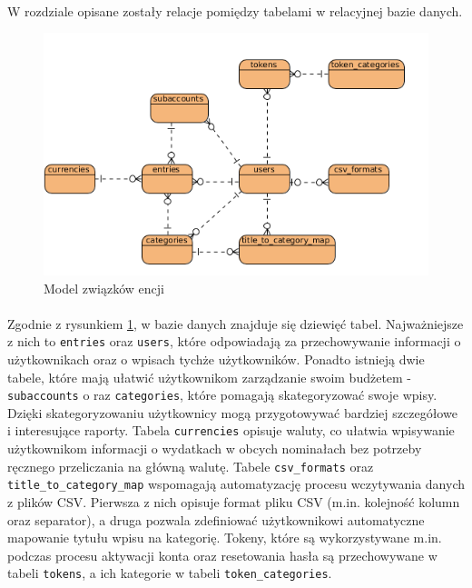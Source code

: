 \documentclass{article}
\begin{document}
	\paragraph{} W rozdziale opisane zostały relacje pomiędzy tabelami w relacyjnej bazie danych.
	\begin{figure}[H]
		\centering
		\includegraphics[width=0.8\linewidth]{assets/erd.png}
		\caption[]{Model związków encji}
		\label{fig:erd}
	\end{figure}

	\paragraph{} Zgodnie z rysunkiem \ref{fig:erd}, w bazie danych znajduje się dziewięć tabel. Najważniejsze z nich to \texttt{entries} oraz \texttt{users}, które odpowiadają za przechowywanie informacji o użytkownikach oraz o wpisach tychże użytkowników. Ponadto istnieją dwie tabele, które mają ułatwić użytkownikom zarządzanie swoim budżetem - \texttt{subaccounts} o raz \texttt{categories}, które pomagają skategoryzować swoje wpisy. Dzięki skategoryzowaniu użytkownicy mogą przygotowywać bardziej szczegółowe i interesujące raporty. Tabela \texttt{currencies} opisuje waluty, co ułatwia wpisywanie użytkownikom informacji o wydatkach w obcych nominałach bez potrzeby ręcznego przeliczania na główną walutę. Tabele \texttt{csv\_formats} oraz \texttt{title\_to\_category\_map} wspomagają automatyzację procesu wczytywania danych z plików CSV. Pierwsza z nich opisuje format pliku CSV (m.in. kolejność kolumn oraz separator), a druga pozwala zdefiniować użytkownikowi automatyczne mapowanie tytułu wpisu na kategorię. Tokeny, które są wykorzystywane m.in. podczas procesu aktywacji konta oraz resetowania hasła są przechowywane w tabeli \texttt{tokens}, a ich kategorie w tabeli \texttt{token\_categories}.
\end{document}
